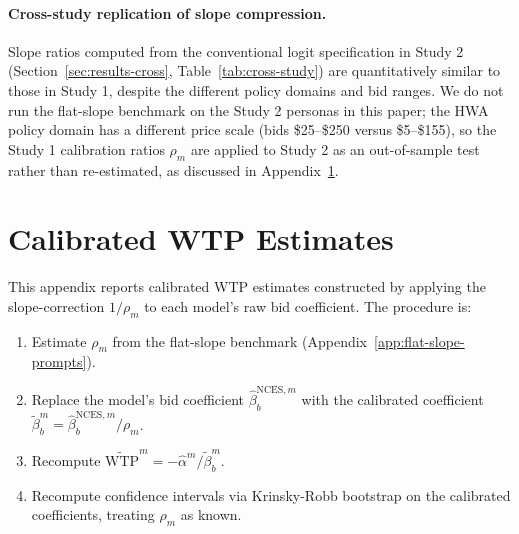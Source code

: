 \documentclass[12pt]{article}
\begin{document}
\paragraph{Cross-study replication of slope compression.} Slope ratios computed from the conventional logit specification in Study 2 (Section~\ref{sec:results-cross}, Table~\ref{tab:cross-study}) are quantitatively similar to those in Study 1, despite the different policy domains and bid ranges. We do not run the flat-slope benchmark on the Study 2 personas in this paper; the HWA policy domain has a different price scale (bids \$25--\$250 versus \$5--\$155), so the Study 1 calibration ratios $\rho_m$ are applied to Study 2 as an out-of-sample test rather than re-estimated, as discussed in Appendix~\ref{app:calibrated-wtp}.

\section{Calibrated WTP Estimates}\label{app:calibrated-wtp}

This appendix reports calibrated WTP estimates constructed by applying the slope-correction $1/\rho_m$ to each model's raw bid coefficient. The procedure is:

\begin{enumerate}[noitemsep]
    \item Estimate $\rho_m$ from the flat-slope benchmark (Appendix~\ref{app:flat-slope-prompts}).
    \item Replace the model's bid coefficient $\hat{\beta}_b^{\text{NCES}, m}$ with the calibrated coefficient $\tilde{\beta}_b^{m} = \hat{\beta}_b^{\text{NCES}, m} / \rho_m$.
    \item Recompute $\widetilde{\text{WTP}}^m = -\hat{\alpha}^m / \tilde{\beta}_b^m$.
    \item Recompute confidence intervals via Krinsky-Robb bootstrap on the calibrated coefficients, treating $\rho_m$ as known.
\end{enumerate}
\end{document}

